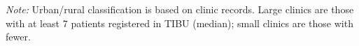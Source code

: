 \begin{minipage}{\wd\ClinicErrBoxGated}
\usebox{\ClinicErrBoxGated}
\par\vspace{4pt}\noindent
\footnotesize{\textit{Note:} Urban/rural classification is based on clinic records. Large clinics are those with at least 7 patients registered in TIBU (median); small clinics are those with fewer.}
\end{minipage}